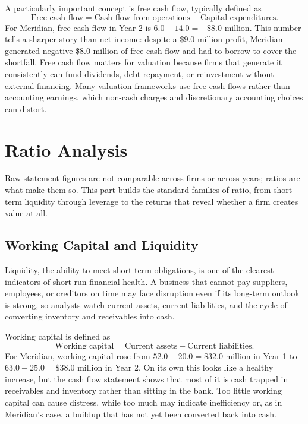 \documentclass[../ai_in_finance]{subfiles}
\begin{document}
A particularly important concept is free cash flow, typically defined as
\begin{equation}
\text{Free cash flow} = \text{Cash flow from operations} - \text{Capital expenditures}.\label{eq:statements-fcf}
\end{equation}
For Meridian, free cash flow in Year 2 is $6.0 - 14.0 = -\$8.0$ million. This number tells a sharper story than net income: despite a \$9.0 million profit, Meridian generated negative \$8.0 million of free cash flow and had to borrow to cover the shortfall. Free cash flow matters for valuation because firms that generate it consistently can fund dividends, debt repayment, or reinvestment without external financing. Many valuation frameworks use free cash flows rather than accounting earnings, which non-cash charges and discretionary accounting choices can distort.

\section{Ratio Analysis}

Raw statement figures are not comparable across firms or across years; ratios are what make them so. This part builds the standard families of ratio, from short-term liquidity through leverage to the returns that reveal whether a firm creates value at all.

\subsection{Working Capital and Liquidity}
\label{sec:statements-working-capital}

Liquidity, the ability to meet short-term obligations, is one of the clearest indicators of short-run financial health. A business that cannot pay suppliers, employees, or creditors on time may face disruption even if its long-term outlook is strong, so analysts watch current assets, current liabilities, and the cycle of converting inventory and receivables into cash.

Working capital is defined as
\begin{equation*}
\text{Working capital} = \text{Current assets} - \text{Current liabilities}.
\end{equation*}
For Meridian, working capital rose from $52.0 - 20.0 = \$32.0$ million in Year 1 to $63.0 - 25.0 = \$38.0$ million in Year 2. On its own this looks like a healthy increase, but the cash flow statement shows that most of it is cash trapped in receivables and inventory rather than sitting in the bank. Too little working capital can cause distress, while too much may indicate inefficiency or, as in Meridian's case, a buildup that has not yet been converted back into cash.
\end{document}
